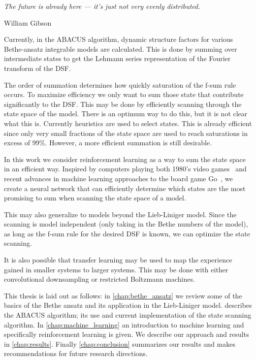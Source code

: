 \documentclass[11pt, a4paper]{report} %
\begin{document}
\epigraph{\textit{The future is already here --- it's just not very evenly distributed.}}{William Gibson}

Currently, in the ABACUS algorithm, dynamic structure factors for various Bethe-ansatz integrable models are calculated.
This is done by summing over intermediate states to get the Lehmann series representation of the Fourier transform of the DSF.

The order of summation determines how quickly saturation of the f-sum rule occurs.
To maximize efficiency we only want to sum those state that contribute significantly to the DSF.
This may be done by efficiently scanning through the state space of the model.
There is an optimum way to do this, but it is not clear what this is.
Currently heuristics are used to select states.
This is already efficient since only very small fractions of the state space are used to reach saturations in excess of 99\%.
However, a more efficient summation is still desirable.

In this work we consider reinforcement learning as a way to sum the state space in an efficient way.
Inspired by computers playing both 1980's video games~\cite{mnih13_playin_atari_with_deep_reinf_learn} and recent advances in machine learning approaches to the board game Go~\cite{Silver2017a,Silver2017}, we create a neural network that can efficiently determine which states are the most promising to sum when scanning the state space of a model.

This may also generalize to models beyond the Lieb-Liniger model.
Since the scanning is model independent (only taking in the Bethe numbers of the model), as long as the f-sum rule for the desired DSF is known, we can optimize the state scanning.

It is also possible that transfer learning may be used to map the experience gained in smaller systems to larger systems.
This may be done with either convolutional downsampling or restricted Boltzmann machines.

This thesis is laid out as follows:
in \cref{chap:bethe_ansatz} we review some of the basics of the Bethe ansatz and its application in the Lieb-Liniger model.
 describes the ABACUS algorithm; its use and current implementation of the state scanning algorithm.
In \cref{chap:machine_learning} an introduction to machine learning and specifically reinforcement learning is given.
We describe our approach and results in \cref{chap:results}.
Finally \cref{chap:conclusion} summarizes our results and makes recommendations for future research directions.
\end{document}
